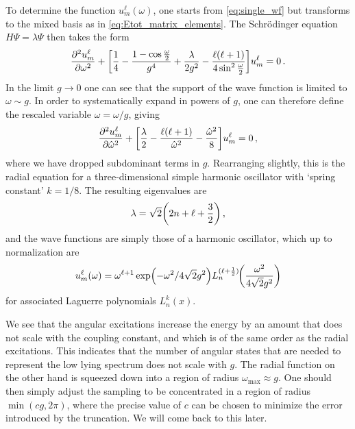 \documentclass[reprint,superscriptaddress,pra,nofootinbib,preprintnumbers,floatfix]{revtex4-1}
\providecommand{\omMax}{\omega_\mathrm{max}}
\begin{document}
To determine the function $u^\ell_m(\omega)$, one starts from \cref{eq:single_wf} but transforms to the mixed basis as in \cref{eq:Etot_matrix_elements}. %
The Schr\"{o}dinger equation $H \Psi = \lambda \Psi$ then takes the form
%
\begin{equation}
    \pdv[2]{u^\ell_m}{\omega}
      + \bqty{\frac{1}{4} - \frac{1-\cos\frac{\omega}{2}}{g^4}
              + \frac{\lambda}{2g^2} - \frac{\ell(\ell+1)}{4 \sin^2 \frac{\omega}{2}}}u^\ell_m = 0 \,.
\end{equation}
%
In the limit $g \to 0$ one can see that the support of the wave function is limited to $\omega \sim g$. 
%
In order to systematically expand in powers of $g$, one can therefore define the rescaled variable $\hat{\omega}=\omega/g$, giving
%
\begin{equation}
    \pdv[2]{u^\ell_m}{\hat{\omega}}
      + \bqty{\frac{\lambda}{2} - \frac{\ell(\ell+1)}{\hat{\omega}^2}
              - \frac{\hat{\omega}^2}{8}} u^\ell_m=0 \,,
\end{equation}
%
where we have dropped subdominant terms in $g$. 
%
Rearranging slightly, this is the radial equation for a three-dimensional simple harmonic oscillator with `spring constant' $k=1/8$. 
%
The resulting eigenvalues are
%
\begin{equation} \label{eq:HO_energies}
    \lambda = \sqrt{2} \pqty{2n + \ell + \frac{3}{2}} \,,
\end{equation}
%
and the wave functions are simply those of a harmonic oscillator, which up to normalization are
%
\begin{equation}
    u^\ell_m(\omega) = \omega^{\ell+1} \exp(-\omega^2 / 4\sqrt{2} g^2)
                         L^{(\ell+\frac{1}{2})}_{n}\!\pqty{\frac{\omega^2}{4\sqrt{2}g^2}}
\end{equation}
%
for associated Laguerre polynomials $L^k_n(x)$.



We see that the angular excitations increase the energy by an amount that does not scale with the coupling constant, and which is of the same order as the radial excitations. 
%
This indicates that the number of angular states that are needed to represent the low lying spectrum does not scale with $g$. 
%
The radial function on the other hand is squeezed down into a region of radius $\omMax \approx g$. 
%
One should then simply adjust the sampling to be concentrated in a region of radius $\min(c g,2\pi)$, where the precise value of $c$ can be chosen to minimize the error introduced by the truncation. 
%
We will come back to this later.  
\end{document}
